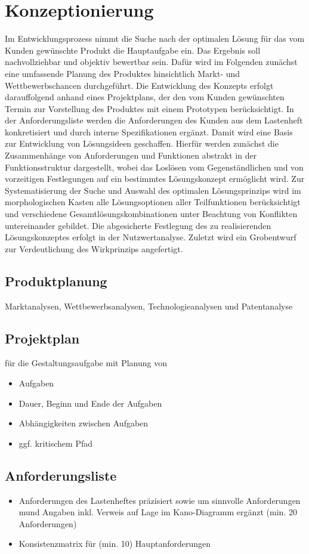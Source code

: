 \chapter{Konzeptionierung}
Im Entwicklungsprozess nimmt die Suche nach der optimalen Lösung für das vom Kunden gewünschte Produkt die Hauptaufgabe ein. Das Ergebnis soll nachvollziehbar und objektiv bewertbar sein. Dafür wird im Folgenden zunächst eine umfassende Planung des Produktes hinsichtlich Markt- und Wettbewerbschancen durchgeführt. Die Entwicklung des Konzepts erfolgt darauffolgend anhand eines Projektplans, der den vom Kunden gewünschten Termin zur Vorstellung des Produktes mit einem Prototypen berücksichtigt. In der Anforderungsliste werden die Anforderungen des Kunden aus dem Lastenheft konkretisiert und durch interne Spezifikationen ergänzt. Damit wird eine Basis zur Entwicklung von Lösungsideen geschaffen. Hierfür werden zunächst die Zusammenhänge von Anforderungen und Funktionen abstrakt in der Funktionsstruktur dargestellt, wobei das Loslösen vom Gegenständlichen und von vorzeitigen Festlegungen auf ein bestimmtes Lösungskonzept ermöglicht wird. Zur Systematisierung der Suche und Auswahl des optimalen Lösungsprinzips wird im morphologischen Kasten alle Lösungsoptionen aller Teilfunktionen berücksichtigt und verschiedene Gesamtlösungskombinationen unter Beachtung von Konflikten untereinander gebildet. Die abgesicherte Festlegung des zu realisierenden Lösungskonzeptes erfolgt in der Nutzwertanalyse. Zuletzt wird ein Grobentwurf zur Verdeutlichung des Wirkprinzips angefertigt.

\section{Produktplanung}
Marktanalysen, Wettbewerbsanalysen, Technologieanalysen und Patentanalyse

\section{Projektplan}
für die Gestaltungsaufgabe mit Planung von
\begin{itemize}
\item Aufgaben
\item Dauer, Beginn und Ende der Aufgaben
\item Abhängigkeiten zwischen Aufgaben
\item ggf. kritischem Pfad
\end{itemize}

\section{Anforderungsliste}
\begin{itemize}
\item Anforderungen des Lastenheftes präzisiert sowie um sinnvolle Anforderungen mund Angaben inkl. Verweis auf Lage im Kano-Diagramm ergänzt (min. 20 Anforderungen)
\item Konsistenzmatrix für (min. 10) Hauptanforderungen
\end{itemize}

